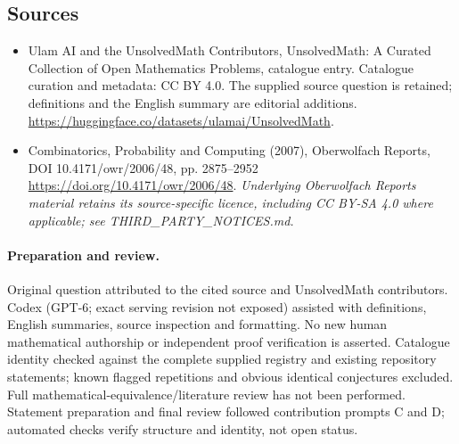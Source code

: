 \documentclass[11pt]{article}
\begin{document}
\subsection{Sources}
\begin{itemize}
\item[\hypertarget{source:statement:1}{S1}] Ulam AI and the UnsolvedMath Contributors, UnsolvedMath: A Curated Collection of Open Mathematics Problems, catalogue entry. Catalogue curation and metadata: CC BY 4.0. The supplied source question is retained; definitions and the English summary are editorial additions.
\url{https://huggingface.co/datasets/ulamai/UnsolvedMath}.
\item[\hypertarget{source:statement:2}{S2}] Combinatorics, Probability and Computing (2007), Oberwolfach Reports, DOI 10.4171/owr/2006/48, pp. 2875--2952
\url{https://doi.org/10.4171/owr/2006/48}.
\textit{Underlying Oberwolfach Reports material retains its source-specific licence, including CC BY-SA 4.0 where applicable; see THIRD\_PARTY\_NOTICES.md.}
\end{itemize}
\paragraph{Preparation and review.}
Original question attributed to the cited source and UnsolvedMath contributors. Codex (GPT-6; exact serving revision not exposed) assisted with definitions, English summaries, source inspection and formatting. No new human mathematical authorship or independent proof verification is asserted. Catalogue identity checked against the complete supplied registry and existing repository statements; known flagged repetitions and obvious identical conjectures excluded. Full mathematical-equivalence/literature review has not been performed. Statement preparation and final review followed contribution prompts C and D; automated checks verify structure and identity, not open status.
\label{end:statement}
\end{document}
